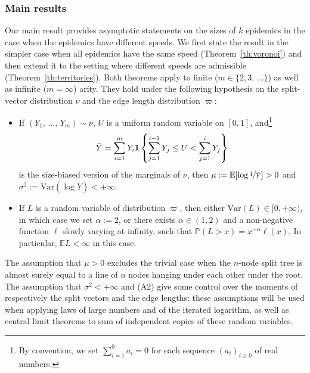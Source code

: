 \documentclass[10pt]{amsart}
\theoremstyle{definition}\newtheorem{defi}[theo]{Definition}\newtheorem{rema}[theo]{Remark}\newtheorem{exam}[theo]{Example}\newtheorem{exem}[theo]{Example}\newtheorem{nota}[theo]{Notation}
\newcommand{\bs}{\ensuremath{\boldsymbol}}
\newcommand{\bbP}{\mathbb{P}}
\newcommand{\bbE}{\mathbb{E}}
\newcommand{\Var}{\mathrm{Var}}
\begin{document}
\subsubsection{Main results}
Our main result provides asymptotic statements on the sizes of $k$ epidemics in the case when the epidemics have different speeds. We first state the result in the simpler case when all epidemics have the same speed (Theorem~\ref{th:voronoi}) and then extend it to the setting where different speeds are admissible (Theorem~\ref{th:territories}). Both theorems apply to finite ($m\in\{2, 3, \,\ldots\}$) as well as infinite ($m=\infty$) arity. They hold under the following hypothesis on the split-vector distribution $\nu$ and the edge length distribution $\varpi$:
\begin{itemize}
\item[(A1)] If $(Y_1, \,\ldots,\, Y_m)\sim \nu$, $U$ is a uniform random variable on $[0,1]$, and\footnote{By convention, we set $\sum_{i=1}^0 a_i = 0$ for each sequence $(a_i)_{i\geq 0}$ of real numbers.}
\begin{equation}\label{eq:barY}
\bar Y = \sum_{i=1}^m Y_i\bs 1\left\{\sum_{j=1}^{i-1} Y_j\leq U<\sum_{j=1}^{i}Y_j\right\}
\end{equation}
is the size-biased version of the marginals of $\nu$, then $\mu:=\bbE[\log \nicefrac{1}{\bar Y}]> 0$ and $\sigma^2:=\Var(\log \bar Y)<+\infty.$
\item[(A2)] If $L$ is a random variable of distribution $\varpi$, then either $\Var(L) \in [0,+\infty)$, in which case we set $\alpha:=2$, or there exists $\alpha\in (1,2)$ and a non-negative function $\ell$ slowly varying at infinity, such that $\bbP(L> x) = x^{-\alpha}\ell(x)$. In particular, $\bbE L < \infty$ in this case.
\end{itemize}

The assumption that $\mu>0$ excludes the trivial case when the $n$-node split tree is almost surely equal to a line of $n$ nodes hanging under each other under the root. The assumption that $\sigma^2<+\infty$ and (A2) give some control over the moments of respectively the split vectors and the edge lengths: these assumptions will be used when applying laws of large numbers and of the iterated logarithm, as well as central limit theorems to sum of independent copies of these random variables.
\end{document}
